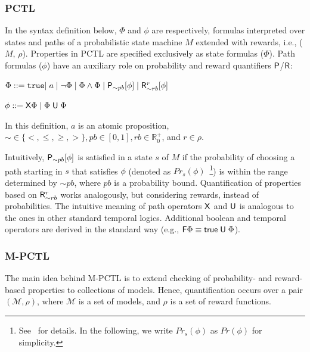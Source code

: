 \documentclass[10pt,journal,compsoc]{IEEEtran}
\begin{document}

\subsubsection{PCTL} In the syntax definition below, $\Phi$ and $\phi$ are respectively, formulas interpreted over states and paths of a probabilistic state machine $M$ extended with rewards, i.e., ($M$, $\rho$). 
Properties in PCTL are specified exclusively as state formulas ($\Phi$). Path formulas ($\phi$) have an auxiliary role on probability and reward quantifiers ${\sf P}$/${\sf R}$:

\smallskip
\centerline{$\Phi ::= {\tt true} | \; a \;  | \; \neg \Phi \; | \; \Phi \wedge \Phi \; | \; {\sf P}_{\sim pb} [\phi] \; | \; {\sf R}^r_{\sim rb} [\phi]$}
\centerline{$\phi ::= {\sf X} \Phi \; | \; \Phi\; {\sf U} \; \Phi$}
\noindent In this definition, $a$ is an atomic proposition, $\sim \in \{<, \leq, \geq, > \}, pb \in [0,1], rb \in \mathds{R}^{+}_{0}$, and $r \in \rho$.

\smallskip
Intuitively, ${\sf P}_{\sim pb}[\phi]$ is satisfied in a state $s$ of $M$ if the probability of choosing a path starting in $s$ that satisfies $\phi$ (denoted as $Pr_s(\phi)$~\footnote{See~\cite{DBLP:conf/sfm/KwiatkowskaNP07} for details. In the following, we write $Pr_s(\phi)$ as $Pr(\phi)$ for simplicity.}) is within the range determined by $\sim\!pb$, where $pb$ is a probability bound. Quantification of properties based on ${\sf R}^r_{\sim rb}$ works analogously, but considering rewards, instead of probabilities. 
The intuitive meaning of path operators ${\sf X}$ and ${\sf U}$ is analogous to the ones in other standard temporal logics. 
Additional boolean and temporal operators are derived in the standard way (e.g., ${\sf F} \Phi \equiv {\sf true} \; {\sf U}\; \Phi$).



\subsubsection{M-PCTL} The main idea behind M-PCTL is to extend checking of probability- and reward-based properties to collections of models. Hence, quantification occurs over a pair $(\mathcal{M}, \rho)$, where $\mathcal{M}$ is a set of models, and $\rho$ is a set of reward functions. 
\end{document}
